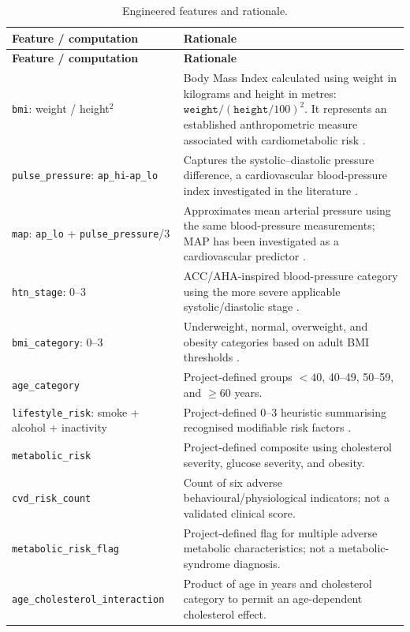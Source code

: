 \documentclass[11pt,a4paper]{article}
\newcommand{\code}[1]{\texttt{#1}}
\begin{document}
{\small
\begin{xltabular}{\textwidth}{@{}p{5.6cm}X@{}}
\caption{Engineered features and rationale.}
\label{tab:engineered}\\
\toprule
\textbf{Feature / computation} & \textbf{Rationale}\\
\midrule
\endfirsthead
\toprule
\textbf{Feature / computation} & \textbf{Rationale}\\
\midrule
\endhead
\bottomrule
\endlastfoot

\code{bmi}: weight / height$^2$ &
Body Mass Index calculated using weight in kilograms and height in metres:
$\code{weight}/(\code{height}/100)^2$. It represents an established
anthropometric measure associated with cardiometabolic risk
\cite{whoObesity2025}.\\

\code{pulse\_pressure}: \code{ap\_hi}-\code{ap\_lo} &
Captures the systolic--diastolic pressure difference, a cardiovascular
blood-pressure index investigated in the literature \cite{sesso2000}.\\

\code{map}: \code{ap\_lo} + \code{pulse\_pressure}/3 &
Approximates mean arterial pressure using the same blood-pressure
measurements; MAP has been investigated as a cardiovascular predictor
\cite{sesso2000}.\\

\code{htn\_stage}: 0--3 & ACC/AHA-inspired blood-pressure category using the more severe applicable systolic/diastolic stage \cite{whelton2018}.\\

\code{bmi\_category}: 0--3 & Underweight, normal, overweight, and obesity categories based on adult BMI thresholds \cite{whoObesity2025}.\\

\code{age\_category} & Project-defined groups $<40$, 40--49, 50--59, and $\geq60$ years.\\

\code{lifestyle\_risk}: smoke + alcohol + inactivity & Project-defined 0--3 heuristic summarising recognised modifiable risk factors \cite{who2025}.\\

\code{metabolic\_risk} & Project-defined composite using cholesterol severity, glucose severity, and obesity.\\

\code{cvd\_risk\_count} & Count of six adverse behavioural/physiological indicators; not a validated clinical score.\\

\code{metabolic\_risk\_flag} & Project-defined flag for multiple adverse metabolic characteristics; not a metabolic-syndrome diagnosis.\\

\code{age\_cholesterol\_interaction} & Product of age in years and cholesterol category to permit an age-dependent cholesterol effect.\\

\end{xltabular}
}
\end{document}
